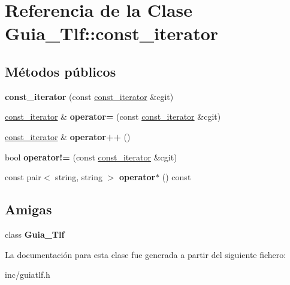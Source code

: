 \hypertarget{classGuia__Tlf_1_1const__iterator}{}\section{Referencia de la Clase Guia\+\_\+\+Tlf\+:\+:const\+\_\+iterator}
\label{classGuia__Tlf_1_1const__iterator}
\subsection*{Métodos públicos}
\begin{DoxyCompactItemize}
\item 
\mbox{\label{classGuia__Tlf_1_1const__iterator_acd2e053e06f056830964f42ba8880531}} 
{\bfseries const\+\_\+iterator} (const \hyperlink{classGuia__Tlf_1_1const__iterator}{const\+\_\+iterator} \&cgit)
\item 
\mbox{\label{classGuia__Tlf_1_1const__iterator_aee24204516e0e2b2ba8f2a5cb09318fe}} 
\hyperlink{classGuia__Tlf_1_1const__iterator}{const\+\_\+iterator} \& {\bfseries operator=} (const \hyperlink{classGuia__Tlf_1_1const__iterator}{const\+\_\+iterator} \&cgit)
\item 
\mbox{\label{classGuia__Tlf_1_1const__iterator_adeb2b592fd9f66095d4586555758b05d}} 
\hyperlink{classGuia__Tlf_1_1const__iterator}{const\+\_\+iterator} \& {\bfseries operator++} ()
\item 
\mbox{\label{classGuia__Tlf_1_1const__iterator_a72d3c02f22a9df836a5f049c4072fd17}} 
bool {\bfseries operator!=} (const \hyperlink{classGuia__Tlf_1_1const__iterator}{const\+\_\+iterator} \&cgit)
\item 
\mbox{\label{classGuia__Tlf_1_1const__iterator_a56996e2361d07397bdb23c5bfde4b5d5}} 
const pair$<$ string, string $>$ {\bfseries operator$\ast$} () const
\end{DoxyCompactItemize}
\subsection*{Amigas}
\begin{DoxyCompactItemize}
\item 
\mbox{\label{classGuia__Tlf_1_1const__iterator_a4349d7a1b26a0aa94447235f95b2f940}} 
class {\bfseries Guia\+\_\+\+Tlf}
\end{DoxyCompactItemize}


La documentación para esta clase fue generada a partir del siguiente fichero\+:\begin{DoxyCompactItemize}
\item 
inc/guiatlf.\+h\end{DoxyCompactItemize}
